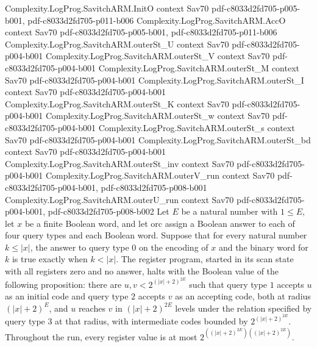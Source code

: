 \begin{theorem}
\proofstep
  {Complexity.LogProg.SavitchARM.InitO}
  {context}
  {Sav70}
  {pdf-c8033d2fd705-p005-b001,
    pdf-c8033d2fd705-p011-b006}
\proofstep
  {Complexity.LogProg.SavitchARM.AccO}
  {context}
  {Sav70}
  {pdf-c8033d2fd705-p005-b001,
    pdf-c8033d2fd705-p011-b006}
\proofstep
  {Complexity.LogProg.SavitchARM.outerSt_U}
  {context}
  {Sav70}
  {pdf-c8033d2fd705-p004-b001}
\proofstep
  {Complexity.LogProg.SavitchARM.outerSt_V}
  {context}
  {Sav70}
  {pdf-c8033d2fd705-p004-b001}
\proofstep
  {Complexity.LogProg.SavitchARM.outerSt_M}
  {context}
  {Sav70}
  {pdf-c8033d2fd705-p004-b001}
\proofstep
  {Complexity.LogProg.SavitchARM.outerSt_I}
  {context}
  {Sav70}
  {pdf-c8033d2fd705-p004-b001}
\proofstep
  {Complexity.LogProg.SavitchARM.outerSt_K}
  {context}
  {Sav70}
  {pdf-c8033d2fd705-p004-b001}
\proofstep
  {Complexity.LogProg.SavitchARM.outerSt_w}
  {context}
  {Sav70}
  {pdf-c8033d2fd705-p004-b001}
\proofstep
  {Complexity.LogProg.SavitchARM.outerSt_s}
  {context}
  {Sav70}
  {pdf-c8033d2fd705-p004-b001}
\proofstep
  {Complexity.LogProg.SavitchARM.outerSt_bd}
  {context}
  {Sav70}
  {pdf-c8033d2fd705-p004-b001}
\proofstep
  {Complexity.LogProg.SavitchARM.outerSt_inv}
  {context}
  {Sav70}
  {pdf-c8033d2fd705-p004-b001}
\proofstep
  {Complexity.LogProg.SavitchARM.outerV_run}
  {context}
  {Sav70}
  {pdf-c8033d2fd705-p004-b001,
    pdf-c8033d2fd705-p008-b001}
\proofstep
  {Complexity.LogProg.SavitchARM.outerU_run}
  {context}
  {Sav70}
  {pdf-c8033d2fd705-p004-b001,
    pdf-c8033d2fd705-p008-b002}
Let $E$ be a natural number with $1\le E$, let $x$ be a finite Boolean word, and let
$\mathrm{orc}$ assign a Boolean answer to each of four query types and each Boolean
word. Suppose that for every natural number $k\le |x|$, the answer to query type $0$ on
the encoding of $x$ and the binary word for $k$ is true exactly when $k<|x|$. The
register program, started in its scan state with all registers zero and no answer, halts
with the Boolean value of the following proposition: there are $u,v<2^{(|x|+2)^{2E}}$
such that query type $1$ accepts $u$ as an initial code and query type $2$ accepts $v$
as an accepting code, both at radius $(|x|+2)^E$, and $u$ reaches $v$ in $(|x|+2)^{2E}$
levels under the relation specified by query type $3$ at that radius, with intermediate
codes bounded by $2^{(|x|+2)^{2E}}$. Throughout the run, every register value is at most
$2^{((|x|+2)^{2E})((|x|+2)^{2E})}$.
\end{theorem}

